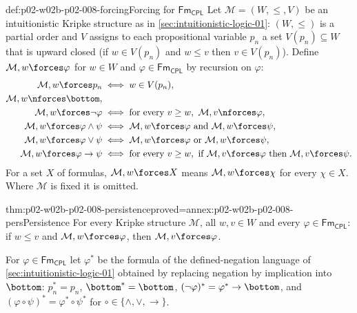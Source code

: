 \begin{hbdefinition}{def:p02-w02b-p02-008-forcing}{Forcing for \(\mathsf{Fm}_{\mathsf{CPL}}\)}
Let \(\mathcal M=(W,\leq,V)\) be an intuitionistic Kripke structure as in
\cref{sec:intuitionistic-logic-01}: \((W,\leq)\) is a partial order and
\(V\) assigns to each propositional variable \(p_n\) a set
\(V(p_n)\subseteq W\) that is upward closed (if \(w\in V(p_n)\) and
\(w\leq v\) then \(v\in V(p_n)\)).  Define \(\mathcal M,w\forces\varphi\)
for \(w\in W\) and \(\varphi\in\mathsf{Fm}_{\mathsf{CPL}}\) by recursion on
\(\varphi\):
\[
\begin{aligned}
  \mathcal M,w\forces p_n
    &\iff w\in V(p_n),\\
  \mathcal M,w\nforces\bottom,&\\
  \mathcal M,w\forces\neg\varphi
    &\iff \text{for every } v\geq w,\ \mathcal M,v\nforces\varphi,\\
  \mathcal M,w\forces\varphi\land\psi
    &\iff \mathcal M,w\forces\varphi\text{ and }\mathcal M,w\forces\psi,\\
  \mathcal M,w\forces\varphi\lor\psi
    &\iff \mathcal M,w\forces\varphi\text{ or }\mathcal M,w\forces\psi,\\
  \mathcal M,w\forces\varphi\to\psi
    &\iff \text{for every } v\geq w,\
      \text{if }\mathcal M,v\forces\varphi\text{ then }\mathcal M,v\forces\psi.
\end{aligned}
\]
For a set \(X\) of formulas, \(\mathcal M,w\forces X\) means
\(\mathcal M,w\forces\chi\) for every \(\chi\in X\).  Where \(\mathcal M\) is
fixed it is omitted.
\end{hbdefinition}

\begin{hblemma}{thm:p02-w02b-p02-008-persistence}{proved=annex:p02-w02b-p02-008-pers}{Persistence}
For every Kripke structure \(\mathcal M\), all \(w,v\in W\) and every
\(\varphi\in\mathsf{Fm}_{\mathsf{CPL}}\): if \(w\leq v\) and
\(\mathcal M,w\forces\varphi\), then \(\mathcal M,v\forces\varphi\).
\end{hblemma}

For \(\varphi\in\mathsf{Fm}_{\mathsf{CPL}}\) let \(\varphi^{\ast}\) be the
formula of the defined-negation language of
\cref{sec:intuitionistic-logic-01} obtained by replacing negation by
implication into \(\bottom\): \(p_n^{\ast}=p_n\), \(\bottom^{\ast}=\bottom\),
\((\neg\varphi)^{\ast}=\varphi^{\ast}\to\bottom\), and
\((\varphi\circ\psi)^{\ast}=\varphi^{\ast}\circ\psi^{\ast}\) for
\(\circ\in\{\land,\lor,\to\}\).


